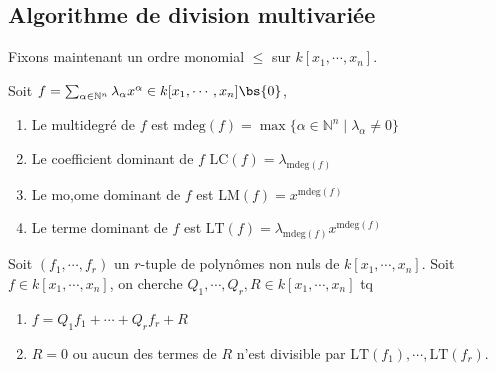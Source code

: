         \subsection{Algorithme de division multivariée}
            Fixons maintenant un ordre monomial $\leq$ sur $k[x_1, \cdots, x_n]$.
            \begin{defi}
                Soit $f = \sum_{\alpha \in \mathbb{N}^n} \lambda_\alpha x^\alpha \in k[x_1, \cdots, x_n] \bs \{0\}$, 
                \begin{enumerate}
                    \item Le multidegré de $f$ est $\mathrm{mdeg}(f) = \max \{\alpha \in \mathbb{N}^n \mid \lambda_\alpha \neq 0\}$
                    \item Le coefficient dominant de $f$ $\mathrm{LC}(f) = \lambda_{\mathrm{mdeg}(f)}$
                    \item Le mo,ome dominant de $f$ est $\mathrm{LM}(f) = x^{\mathrm{mdeg}(f)}$
                    \item Le terme dominant de $f$ est $\mathrm{LT}(f) = \lambda_{\mathrm{mdeg}(f)}x^{\mathrm{mdeg}(f)}$
                \end{enumerate}
            \end{defi}
            Soit $(f_1, \cdots, f_r)$ un $r$-tuple de polynômes non nuls de $k[x_1, \cdots, x_n]$. Soit $f \in k[x_1, \cdots, x_n]$, on cherche $Q_1, \cdots, Q_r, R \in k[x_1, \cdots, x_n]$ tq
            \begin{enumerate}
                \item $f = Q_1f_1 + \cdots + Q_r f_r + R$
                \item $R = 0$ ou aucun des termes de $R$ n'est divisible par $\mathrm{LT}(f_1), \cdots, \mathrm{LT}(f_r)$.
            \end{enumerate}
            
